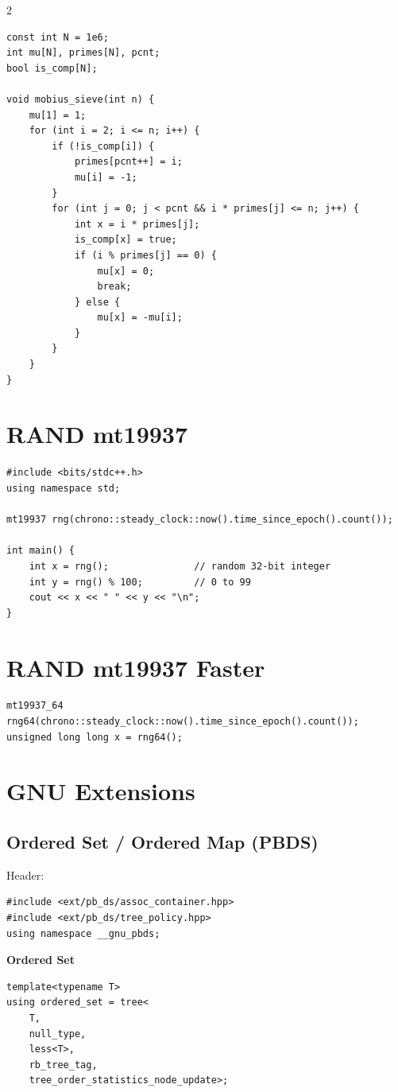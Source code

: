 \documentclass[a4paper,landscape]{article}
\begin{document}
\begin{multicols}{2}
\begin{lstlisting}
const int N = 1e6;
int mu[N], primes[N], pcnt;
bool is_comp[N];

void mobius_sieve(int n) {
    mu[1] = 1;
    for (int i = 2; i <= n; i++) {
        if (!is_comp[i]) {
            primes[pcnt++] = i;
            mu[i] = -1;
        }
        for (int j = 0; j < pcnt && i * primes[j] <= n; j++) {
            int x = i * primes[j];
            is_comp[x] = true;
            if (i % primes[j] == 0) {
                mu[x] = 0;
                break;
            } else {
                mu[x] = -mu[i];
            }
        }
    }
}
\end{lstlisting}
\hline
\section{RAND mt19937}
\hline
\begin{lstlisting}
#include <bits/stdc++.h>
using namespace std;

mt19937 rng(chrono::steady_clock::now().time_since_epoch().count());

int main() {
    int x = rng();               // random 32-bit integer
    int y = rng() % 100;         // 0 to 99
    cout << x << " " << y << "\n";
}
\end{lstlisting}
\hline
\section{RAND mt19937 Faster}
\hline
\begin{lstlisting}
mt19937_64 rng64(chrono::steady_clock::now().time_since_epoch().count());
unsigned long long x = rng64();
\end{lstlisting}
\hline
\section{GNU Extensions}
\hline
\subsection*{Ordered Set / Ordered Map (PBDS)}

Header:
\begin{lstlisting}
#include <ext/pb_ds/assoc_container.hpp>
#include <ext/pb_ds/tree_policy.hpp>
using namespace __gnu_pbds;
\end{lstlisting}

\textbf{Ordered Set}

\begin{lstlisting}
template<typename T>
using ordered_set = tree<
    T,
    null_type,
    less<T>,
    rb_tree_tag,
    tree_order_statistics_node_update>;
\end{lstlisting}


\end{multicols}
\end{document}
